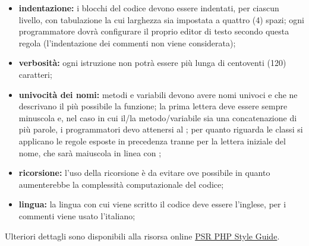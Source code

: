 \begin{itemize}
\begin{itemize}
\begin{lstlisting}[language=php,captionpos=b,caption={Esempio per la sintassi PHP}]
		namespace Vendor\Package;

		use Vendor\Package\{ClassA as A, ClassB, ClassC as C};
		use Vendor\Package\SomeNamespace\ClassD as D;

		use function Vendor\Package\{functionA, functionB, functionC};

		use const Vendor\Package\{ConstantA, ConstantB, ConstantC};

		class Foo extends Bar implements FooInterface
		{
				public function sampleFunction(int $a, int $b = null): array
				{
						if ($a === $b) {
								bar();
						} elseif ($a > $b) {
								$foo->bar($arg1);
						} else {
								BazClass::bar($arg2, $arg3);
						}
				}

				final public static function bar()
				{
						// method body
				}
		}
								\end{lstlisting}
								\item \textbf{indentazione:} i blocchi del codice devono essere indentati, per ciascun livello, con tabulazione la cui larghezza sia impostata a quattro (4) spazi; ogni programmatore dovrà configurare il proprio editor di testo secondo questa regola (l'indentazione dei commenti non viene considerata);
								\item \textbf{verbosità:} ogni istruzione non potrà essere più lunga di centoventi (120) caratteri;
								\item \textbf{univocità dei nomi:} metodi e variabili devono avere nomi univoci e che ne descrivano il più possibile la funzione; la prima lettera deve essere sempre minuscola e, nel caso in cui il/la metodo/variabile sia una concatenazione di più parole, i programmatori devo attenersi al ; per quanto riguarda le classi si applicano le regole esposte in precedenza tranne per la lettera iniziale del nome, che sarà maiuscola in linea con ;
								\item \textbf{ricorsione:} l’uso della ricorsione è da evitare ove possibile in quanto aumenterebbe la complessità computazionale del codice;
								\item \textbf{lingua:} la lingua con cui viene scritto il codice deve essere l’inglese, per i commenti viene usato l'italiano;
							\end{itemize}
							Ulteriori dettagli sono disponibili alla risorsa online \href{https://www.php-fig.org/psr/psr-12}{PSR PHP Style Guide}.
					\end{itemize}


